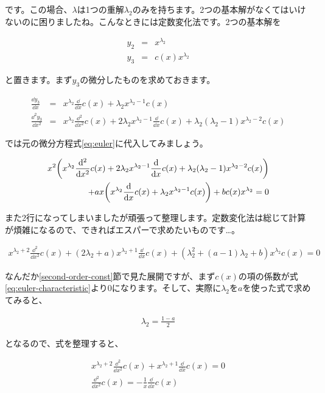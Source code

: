 です。この場合、$\lambda$は1つの重解$\lambda_2$のみを持ちます。2つの基本解がなくてはいけないのに困りましたね。こんなときには定数変化法です。2つの基本解を

\begin{eqnarray}
    y_2&=&x^{\lambda_2} \\
    y_3&=&c(x)x^{\lambda_2}
\end{eqnarray}

\noindent
と置きます。まず$y_3$の微分したものを求めておきます。

\begin{eqnarray}
    \frac{\dd y_3}{\dd x}&=&x^{\lambda_2}\frac{\dd}{\dd x}c(x)+\lambda_2x^{\lambda_2-1}c(x) \\
    \frac{\dd^2 y_3}{\dd x^2}&=&x^{\lambda_2}\frac{\dd^2}{\dd x^2}c(x)+2\lambda_2x^{\lambda_2-1}\frac{\dd}{\dd x}c(x)+\lambda_2(\lambda_2-1)x^{\lambda_2-2}c(x)
\end{eqnarray}

では元の微分方程式\ref{eq:euler}に代入してみましょう。

\begin{eqnarray}
    x^2\pqty{x^{\lambda_2}\frac{\dd^2}{\dd x^2}c(x)+2\lambda_2x^{\lambda_2-1}\frac{\dd}{\dd x}c(x)+\lambda_2(\lambda_2-1)x^{\lambda_2-2}c(x)} \nonumber \\
    +ax\pqty{x^{\lambda_2}\frac{\dd}{\dd x}c(x)+\lambda_2x^{\lambda_2-1}c(x)}+bc(x)x^{\lambda_2}=0
\end{eqnarray}

また2行になってしまいましたが頑張って整理します。定数変化法は総じて計算が煩雑になるので、できればエスパーで求めたいものです…。

\begin{eqnarray}
    x^{\lambda_2+2}\frac{\dd^2}{\dd x^2}c(x)+(2\lambda_2+a)x^{\lambda_2+1}\frac{\dd}{\dd x}c(x)+(\lambda_2^2+(a-1)\lambda_2+b)x^{\lambda_2}c(x)=0
\end{eqnarray}

なんだか\ref{second-order-const}節で見た展開ですが、まず$c(x)$の項の係数が式\ref{eq:euler-characteristic}より0になります。そして、実際に$\lambda_2$を$a$を使った式で求めてみると、

\begin{eqnarray}
    \lambda_2=\frac{1-a}{2}
\end{eqnarray}

\noindent
となるので、式を整理すると、

\begin{eqnarray}
    x^{\lambda_2+2}\frac{\dd^2}{\dd x^2}c(x)+x^{\lambda_2+1}\frac{\dd}{\dd x}c(x)=0 \\
    \frac{\dd^2}{\dd x^2}c(x)=-\frac{1}{x}\frac{\dd}{\dd x}c(x)
\end{eqnarray}

